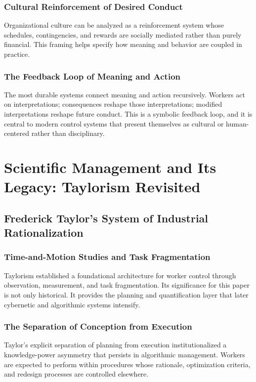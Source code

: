 \documentclass[11pt, a4paper]{article}
\begin{document}
\subsubsection{Cultural Reinforcement of Desired Conduct}
Organizational culture can be analyzed as a reinforcement system whose schedules, contingencies, and rewards are socially mediated rather than purely financial. This framing helps specify how meaning and behavior are coupled in practice.

\subsubsection{The Feedback Loop of Meaning and Action}
The most durable systems connect meaning and action recursively. Workers act on interpretations; consequences reshape those interpretations; modified interpretations reshape future conduct. This is a symbolic feedback loop, and it is central to modern control systems that present themselves as cultural or human-centered rather than disciplinary.

\section{Scientific Management and Its Legacy: Taylorism Revisited}

\subsection{Frederick Taylor's System of Industrial Rationalization}

\subsubsection{Time-and-Motion Studies and Task Fragmentation}
Taylorism established a foundational architecture for worker control through observation, measurement, and task fragmentation. Its significance for this paper is not only historical. It provides the planning and quantification layer that later cybernetic and algorithmic systems intensify.

\subsubsection{The Separation of Conception from Execution}
Taylor's explicit separation of planning from execution institutionalized a knowledge-power asymmetry that persists in algorithmic management. Workers are expected to perform within procedures whose rationale, optimization criteria, and redesign processes are controlled elsewhere.
\end{document}
